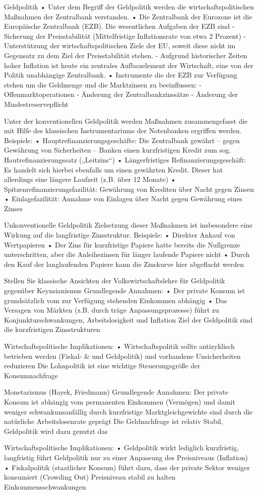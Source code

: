 Geldpolitik
• Unter dem Begriff der Geldpolitik werden die wirtschaftspolitischen Maßnahmen der
Zentralbank verstanden.
• Die Zentralbank der Eurozone ist die Europäische Zentralbank (EZB). Die wesentlichen
Aufgaben der EZB sind
- Sicherung der Preisstabilität (Mittelfristige Inflationsrate von etwa 2 Prozent)
- Unterstützung der wirtschaftspolitischen Ziele der EU, soweit diese nicht im Gegensatz zu
dem Ziel der Preisstabilität stehen.
- Aufgrund historischer Zeiten hoher Inflation ist heute ein zentrales Aufbauelement der
Wirtschaft, eine von der Politik unabhängige Zentralbank.
• Instrumente die der EZB zur Verfügung stehen um die Geldmenge und die Marktzinsen zu
beeinflussen:
- Offenmarktoperationen
- Änderung der Zentralbankzinssätze
- Änderung der Mindestreservepflicht

Unter der konventionellen Geldpolitik werden Maßnahmen zusammengefasst die mit Hilfe
des klassischen Instrumentariums der Notenbanken ergriffen werden.
Beispiele:
• Hauptrefinanzierungsgeschäfte: Die Zentralbank gewährt – gegen Gewährung
von Sicherheiten – Banken einen kurzfristigen Kredit zum sog. Hautrefinanzierungssatz
(„Leitzins“)
• Längerfristiges Refinanzierungsgeschäft: Es handelt sich hierbei ebenfalls um einen
gewährten Kredit. Dieser hat allerdings eine längere Laufzeit (z.B. über 12 Monate)
• Spitzenrefinanzierungsfazilität: Gewährung von Krediten über Nacht gegen Zinsen
• Einlagefazilität: Annahme von Einlagen über Nacht gegen Gewährung eines Zinses

Unkonventionelle Geldpolitik
Zielsetzung dieser Maßnahmen ist insbesondere eine Wirkung auf die langfristige Zinsstruktur.
Beispiele:
• Direkter Ankauf von Wertpapieren
• Der Zins für kurzfristige Papiere hatte bereits die Nullgrenze unterschritten, aber die
Anleihezinsen für länger laufende Papiere nicht
• Durch den Kauf der langlaufenden Papiere kann die Zinskurve hier abgeflacht werden


Stellen Sie klassische Ansichten der Volkswirtschaftslehre für Geldpolitik gegenüber
Keynsianismus
Grundlegende Annahmen:
• Der private Konsum ist grundsätzlich vom zur Verfügung stehenden
Einkommen abhängig
• Das Versagen von Märkten (z.B. durch träge Anpassungsprozesse)
führt zu Konjunkturschwankungen, Arbeitslosigkeit und Inflation
Ziel der Geldpolitik sind die kurzfristigen Zinsstrukturen

Wirtschaftspolitische Implikationen:
• Wirtschaftspolitik sollte antizyklisch betrieben werden (Fiskal- & und
Geldpolitik) und vorhandene Unsicherheiten reduzieren
Die Lohnpolitik ist eine wichtige Steuerungsgröße der
Konsumnachfrage

Monetarismus (Hayek, Friedmann)
Grundlegende Annahmen:
Der private Konsum ist abhängig vom permanenten Einkommen
(Vermögen) und damit weniger schwankunsanfällig durch kurzfristige
Marktgleichgewichte sind durch die natürliche Arbeitslosenrate
geprägt
Die Geldnachfrage ist relativ Stabil, Geldpolitik wird dazu genutzt das

Wirtschaftspolitische Implikationen:
• Geldpolitik wirkt lediglich kurzfristig, langfristig führt Geldpolitik nur zu
einer Anpassung des Preisniveaus (Inflation)
• Fiskalpolitik (staatlicher Konsum) führt dazu, dass der private Sektor
weniger konsumiert (Crowding Out)
Preisniveau stabil zu halten
Einkommensschwankungen
